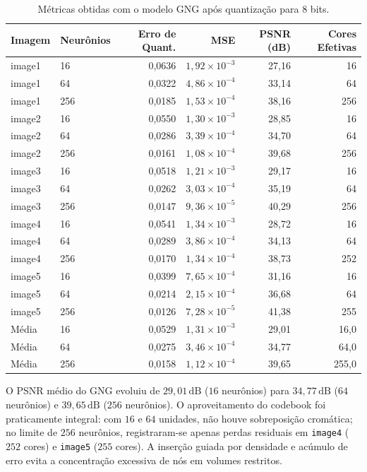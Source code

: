 \documentclass[11pt,a4paper]{article}
\begin{document}
\begin{table}[H]
\centering
\caption{Métricas obtidas com o modelo GNG após quantização para $8$ bits.}
\label{tab:gng}
\small
\begin{tabular}{llrrrr}
\toprule
Imagem & Neurônios & Erro de Quant. & MSE & PSNR (dB) & Cores Efetivas \\
\midrule
image1 & 16  & 0,0636 & $1{,}92 \times 10^{-3}$ & 27,16 & 16 \\
image1 & 64  & 0,0322 & $4{,}86 \times 10^{-4}$ & 33,14 & 64 \\
image1 & 256 & 0,0185 & $1{,}53 \times 10^{-4}$ & 38,16 & 256 \\
\midrule
image2 & 16  & 0,0550 & $1{,}30 \times 10^{-3}$ & 28,85 & 16 \\
image2 & 64  & 0,0286 & $3{,}39 \times 10^{-4}$ & 34,70 & 64 \\
image2 & 256 & 0,0161 & $1{,}08 \times 10^{-4}$ & 39,68 & 256 \\
\midrule
image3 & 16  & 0,0518 & $1{,}21 \times 10^{-3}$ & 29,17 & 16 \\
image3 & 64  & 0,0262 & $3{,}03 \times 10^{-4}$ & 35,19 & 64 \\
image3 & 256 & 0,0147 & $9{,}36 \times 10^{-5}$ & 40,29 & 256 \\
\midrule
image4 & 16  & 0,0541 & $1{,}34 \times 10^{-3}$ & 28,72 & 16 \\
image4 & 64  & 0,0289 & $3{,}86 \times 10^{-4}$ & 34,13 & 64 \\
image4 & 256 & 0,0170 & $1{,}34 \times 10^{-4}$ & 38,73 & 252 \\
\midrule
image5 & 16  & 0,0399 & $7{,}65 \times 10^{-4}$ & 31,16 & 16 \\
image5 & 64  & 0,0214 & $2{,}15 \times 10^{-4}$ & 36,68 & 64 \\
image5 & 256 & 0,0126 & $7{,}28 \times 10^{-5}$ & 41,38 & 255 \\
\midrule
Média  & 16  & 0,0529 & $1{,}31 \times 10^{-3}$ & 29,01 & 16,0 \\
Média  & 64  & 0,0275 & $3{,}46 \times 10^{-4}$ & 34,77 & 64,0 \\
Média  & 256 & 0,0158 & $1{,}12 \times 10^{-4}$ & 39,65 & 255,0 \\
\bottomrule
\end{tabular}
\end{table}

O PSNR médio do GNG evoluiu de $29{,}01\,\mathrm{dB}$ ($16$ neurônios) para $34{,}77\,\mathrm{dB}$ ($64$ neurônios) e $39{,}65\,\mathrm{dB}$ ($256$ neurônios). O aproveitamento do codebook foi praticamente integral: com $16$ e $64$ unidades, não houve sobreposição cromática; no limite de $256$ neurônios, registraram-se apenas perdas residuais em \texttt{image4} ($252$ cores) e \texttt{image5} ($255$ cores). A inserção guiada por densidade e acúmulo de erro evita a concentração excessiva de nós em volumes restritos.
\end{document}
